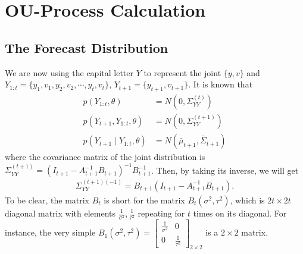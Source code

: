\section{OU-Process Calculation}\label{OUcalculation}

\subsection*{The Forecast Distribution}
We are now using the capital letter $Y$ to represent the joint $\{y,v\}$ and $Y_{1:t} = \{y_1,v_1,y_2,v_2,\cdots, y_t, v_t \}$, $Y_{t+1} = \{y_{t+1}, v_{t+1}\}$. It is known that 
\begin{align*}
p\left(Y_{1:t},\theta\right) &= N\left( 0,\Sigma_{YY}^{\left(t\right)} \right)\\
p\left(Y_{t+1},Y_{1:t},\theta\right) &= N\left( 0,\Sigma_{YY}^{\left(t+1\right)} \right)\\
p\left(Y_{t+1}\mid Y_{1:t},\theta\right) &= N\left( \bar{\mu}_{t+1},\bar{\Sigma}_{t+1} \right)
\end{align*}
where the covariance matrix of the joint distribution is $\Sigma_{YY}^{\left(t+1\right)} = \left(I_{t+1}-A_{t+1}^{-1}B_{t+1}\right)^{-1}B_{t+1}^{-1}$. Then, by taking its inverse, we will get
\begin{align*}
\Sigma_{YY}^{\left(t+1\right) \left(-1\right)} = B_{t+1}\left(I_{t+1}-A_{t+1}^{-1}B_{t+1}\right).
\end{align*}
To be clear, the matrix $B_t$ is short for the matrix $B_t\left(\sigma^2,\tau^2\right)$, which is $2t\times 2t$ diagonal matrix with elements $\frac{1}{\sigma^2},\frac{1}{\tau^2}$ repeating for $t$ times on its diagonal. For instance, the very simple $B_1\left(\sigma^2,\tau^2\right) = 
\begin{bmatrix}
\frac{1}{\sigma^2} & 0  \\
0 & \frac{1}{\tau^2}
\end{bmatrix}_{2\times 2}$ is a $2\times 2$ matrix. 


